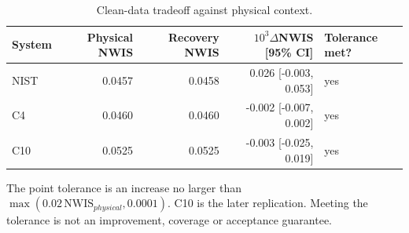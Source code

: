 \begin{table}[t]
\centering\footnotesize
\caption{Clean-data tradeoff against physical context.}
\label{tab:clean}
\setlength{\tabcolsep}{4pt}
\begin{tabular}{lrrrl}
\hline
System & Physical NWIS & Recovery NWIS & $10^3\Delta$NWIS [95\% CI] & Tolerance met? \\
\hline
NIST & 0.0457 & 0.0458 & 0.026 [-0.003, 0.053] & yes \\
C4 & 0.0460 & 0.0460 & -0.002 [-0.007, 0.002] & yes \\
C10 & 0.0525 & 0.0525 & -0.003 [-0.025, 0.019] & yes \\
\hline
\end{tabular}
\par\smallskip
\begin{minipage}{\textwidth}\scriptsize
The point tolerance is an increase no larger than $\max(0.02\,\mathrm{NWIS}_{physical},0.0001)$. C10 is the later replication. Meeting the tolerance is not an improvement, coverage or acceptance guarantee.
\end{minipage}
\end{table}
